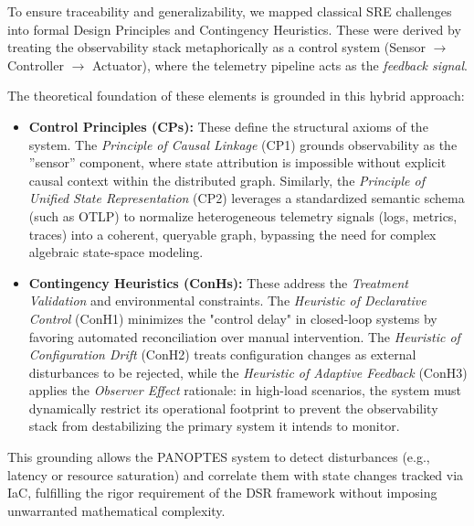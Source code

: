To ensure traceability and generalizability, we mapped classical SRE challenges into formal Design Principles and Contingency Heuristics. These were derived by treating the observability stack metaphorically as a control system (Sensor $\rightarrow$ Controller $\rightarrow$ Actuator), where the telemetry pipeline acts as the \textit{feedback signal}.



The theoretical foundation of these elements is grounded in this hybrid approach:
\begin{itemize}
    \item \textbf{Control Principles (CPs):} These define the structural axioms of the system. The \textit{Principle of Causal Linkage} (CP1) grounds observability as the ''sensor'' component, where state attribution is impossible without explicit causal context within the distributed graph. Similarly, the \textit{Principle of Unified State Representation} (CP2) leverages a standardized semantic schema (such as OTLP) to normalize heterogeneous telemetry signals (logs, metrics, traces) into a coherent, queryable graph, bypassing the need for complex algebraic state-space modeling.
    
    \item \textbf{Contingency Heuristics (ConHs):} These address the \textit{Treatment Validation} and environmental constraints. The \textit{Heuristic of Declarative Control} (ConH1) minimizes the "control delay" in closed-loop systems by favoring automated reconciliation over manual intervention. The \textit{Heuristic of Configuration Drift} (ConH2) treats configuration changes as external disturbances to be rejected, while the \textit{Heuristic of Adaptive Feedback} (ConH3) applies the \textit{Observer Effect} rationale: in high-load scenarios, the system must dynamically restrict its operational footprint to prevent the observability stack from destabilizing the primary system it intends to monitor.
\end{itemize}

This grounding allows the PANOPTES system to detect disturbances (e.g., latency or resource saturation) and correlate them with state changes tracked via IaC, fulfilling the rigor requirement of the DSR framework without imposing unwarranted mathematical complexity.